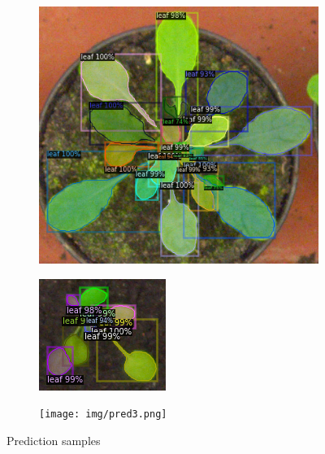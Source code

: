 \documentclass[conference]{IEEEtran}
\begin{document}
\begin{figure}[h!]
\centering
\begin{subfigure}[h!]{0.24\textwidth}
    \centering
    \includegraphics[width=\textwidth]{img/pred1.png}
\end{subfigure}
\hfill
\begin{subfigure}[h!]{0.24\textwidth}
    \centering
    \includegraphics[width=\textwidth]{img/pred2.png}
\end{subfigure}
\hfill
\begin{subfigure}[h!]{0.4\textwidth}
    \centering
    \texttt{[image: img/pred3.png]}
\end{subfigure}
\caption{Prediction samples}
\label{fig:prediction}
\end{figure}
\end{document}
